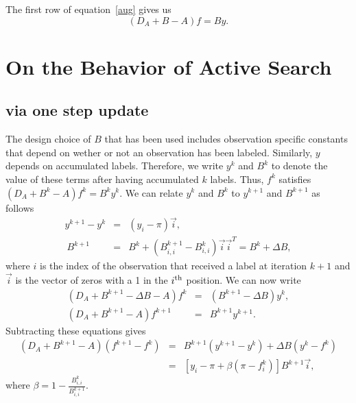 \documentclass[12pt]{article}
\begin{document}
The first row of equation~\ref{aug} gives us
\begin{equation}
  (D_A+B-A)f = By.
\end{equation}

\section{On the Behavior of Active Search}

\subsection{via one step update}
The design choice of $B$ that has been used includes observation specific constants that depend on wether or not an observation has been labeled. Similarly, $y$ depends on accumulated labels. Therefore, we write $y^k$ and $B^k$ to denote the value of these terms after having accumulated $k$ labels. Thus, $f^k$ satisfies $(D_A+B^k-A)f^k = B^ky^k$. We can relate $y^k$ and $B^k$ to $y^{k+1}$ and $B^{k+1}$ as follows
\begin{eqnarray}
   y^{k+1}-y^k &=& (y_i-\pi)\vec{i}, \\~B^{k+1}&=&B^k+(B^{k+1}_{i,i}-B^k_{i,i})\vec{i}\vec{i}^T = B^k+\Delta B,
\end{eqnarray}
where $i$ is the index of the observation that received a label at iteration $k+1$ and $\vec{i}$ is the vector of zeros with a 1 in the $i^{\rm th}$ position. We can now write
\begin{eqnarray}
(D_A+B^{k+1}-\Delta B-A)f^k &=& (B^{k+1}-\Delta B)y^k, \\
(D_A+B^{k+1}-A)f^{k+1} &=& B^{k+1}y^{k+1}.
\end{eqnarray}
Subtracting these equations gives
\begin{eqnarray}
  (D_A+B^{k+1}-A)(f^{k+1}-f^k) &=& B^{k+1}(y^{k+1}-y^k) + \Delta B (y^k - f^k) \nonumber \\ &=& \left[y_i-\pi+\beta (\pi - f^k_i)\right]B^{k+1}\vec{i}, \label{delta}
\end{eqnarray}
where $\beta = 1- \tfrac{B^k_{i,i}}{B^{k+1}_{i,i}}$.
\end{document}

